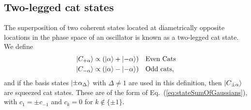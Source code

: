 \documentclass[aps,prx,showpacs,notitlepage,twocolumn,superscriptaddress,nofootinbib,preprintnumbers,floatfix,10pt, longbibliography]{revtex4-2}
\begin{document}
\subsection{Two-legged cat states}\label{ssec:Cat_States}
The superposition of two coherent states located at diametrically opposite locations in the phase space of an oscillator is known as a two-legged cat state. %
We define
\begin{align}
  \ket{C_{+\alpha}}&\propto(\ket{\alpha}+\ket{-\alpha})\quad \text{Even Cats}\\
  \ket{C_{-\alpha}}&\propto(\ket{\alpha}-\ket{-\alpha})\quad\text{Odd cats},
\end{align}
and if the basis states $\ket{\pm\alpha_\Delta}$ with $\Delta\neq 1$ are used in this definition, then $\ket{C_{\pm\alpha}}$ are squeezed cat states. These are of the form of Eq.~(\ref{eq:stateSumOfGaussians}), with $c_1 = \pm c_{-1}$ and $c_{k}=0$ for $k \notin \{\pm1\}$.
\end{document}
